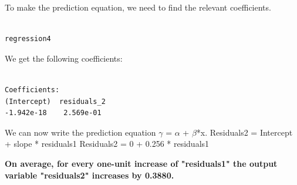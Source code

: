 \documentclass[12pt,letterpaper]{article}
\begin{document}
To make the prediction equation, we need to find the relevant coefficients. 

\begin{BVerbatim}
	
regression4

\end{BVerbatim}

We get the following coefficients: 

\begin{BVerbatim}
	
Coefficients:
(Intercept)  residuals_2  
-1.942e-18    2.569e-01  

\end{BVerbatim}

We can now write the prediction equation $\gamma$ = $\alpha$ + $\beta$*x.
\newline Residuals2 = Intercept + slope * residuals1
\newline Residuals2	 = 0 + 0.256 * residuals1


\textbf{On average, for every one-unit increase of "residuals1" the output variable "residuals2" increases by 0.3880. }
\end{document}
